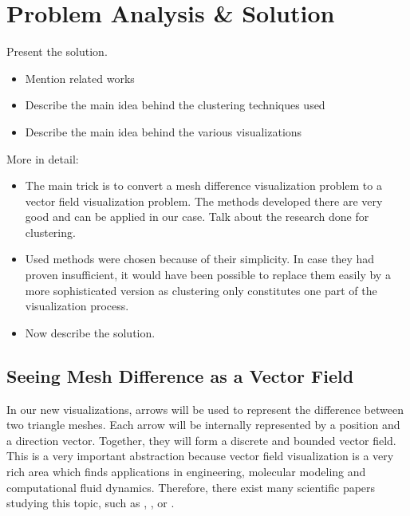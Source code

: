 \chapter{Problem Analysis \& Solution}

Present the solution.

\begin{itemize}
\item Mention related works
\item Describe the main idea behind the clustering techniques used
\item Describe the main idea behind the various visualizations
\end{itemize}

More in detail:

\begin{itemize}
\item The main trick is to convert a mesh difference visualization problem to a vector field visualization problem. The methods developed there are very good and can be applied in our case. Talk about the research done for clustering.
\item Used methods were chosen because of their simplicity. In case they had proven insufficient, it would have been possible to replace them easily by a more sophisticated version as clustering only constitutes one part of the visualization process.
\item Now describe the solution.
\end{itemize}

\section{Seeing Mesh Difference as a Vector Field}

In our new visualizations, arrows will be used to represent the difference between two triangle meshes. Each arrow will be internally represented by a position and a direction vector. Together, they will form a discrete and bounded vector field. This is a very important abstraction because vector field visualization is a very rich area which finds applications in engineering, molecular modeling and computational fluid dynamics. Therefore, there exist many scientific papers studying this topic, such as \citet{Telea99}, \citet{Garcke00}, \citet{Du04} or \citet{Peng12}.

